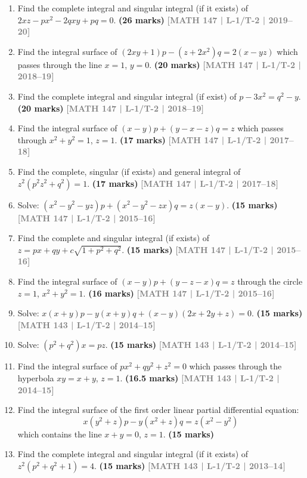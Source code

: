 \documentclass[12pt,a3paper]{article}
\newcommand{\yr}[1]{\hfill\textcolor{gray}{\small\textbf{[#1]}}}
\newcommand{\mk}[1]{\textcolor{orange!70!black}{\small\textbf{(#1 marks)}}}
\begin{document}
\begin{enumerate}
\item Find the complete integral and singular integral (if it exists) of $2xz-px^{2}-2qxy+pq=0$.
\mk{26} \yr{MATH 147 | L-1/T-2 | 2019--20}


\item Find the integral surface of $(2xy+1)p-(z+2x^{2})q=2(x-yz)$ which passes through the line $x=1$, $y=0$.
\mk{20} \yr{MATH 147 | L-1/T-2 | 2018--19}


\item Find the complete integral and singular integral (if exist) of $p-3x^{2}=q^{2}-y$.
\mk{20} \yr{MATH 147 | L-1/T-2 | 2018--19}


\item Find the integral surface of $(x-y)p+(y-x-z)q=z$ which passes through $x^{2}+y^{2}=1$, $z=1$.
\mk{17} \yr{MATH 147 | L-1/T-2 | 2017--18}


\item Find the complete, singular (if exists) and general integral of $z^{2}(p^{2}z^{2}+q^{2})=1$.
\mk{17} \yr{MATH 147 | L-1/T-2 | 2017--18}


\item Solve: $(x^{2}-y^{2}-yz)p+(x^{2}-y^{2}-zx)q=z(x-y)$.
\mk{15} \yr{MATH 147 | L-1/T-2 | 2015--16}


\item Find the complete and singular integral (if exists) of $z=px+qy+c\sqrt{1+p^{2}+q^{2}}$.
\mk{15} \yr{MATH 147 | L-1/T-2 | 2015--16}


\item Find the integral surface of $(x-y)p+(y-z-x)q=z$ through the circle $z=1$, $x^{2}+y^{2}=1$.
\mk{16} \yr{MATH 147 | L-1/T-2 | 2015--16}


\item Solve: $x(x+y)p-y(x+y)q+(x-y)(2x+2y+z)=0$.
\mk{15} \yr{MATH 143 | L-1/T-2 | 2014--15}


\item Solve: $(p^{2}+q^{2})x=pz$.
\mk{15} \yr{MATH 143 | L-1/T-2 | 2014--15}


\item Find the integral surface of $px^{2}+qy^{2}+z^{2}=0$ which passes through the hyperbola $xy=x+y$, $z=1$.
\mk{16.5} \yr{MATH 143 | L-1/T-2 | 2014--15}


\item Find the integral surface of the first order linear partial differential equation: 
\[
x(y^2+z)p-y(x^2+z)q=z(x^2-y^2)
\]
which contains the line $x+y=0$, $z=1$.
\mk{15}


\item Find the complete integral and singular integral (if it exists) of $z^{2}(p^{2}+q^{2}+1)=4$.
\mk{15} \yr{MATH 143 | L-1/T-2 | 2013--14}



\end{enumerate}
\end{document}
